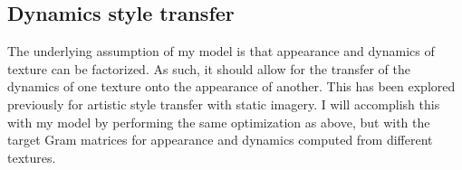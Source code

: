 \subsection{Dynamics style transfer}
The underlying assumption of my model is that appearance
and dynamics of texture can be factorized.
As such, it should allow for the transfer of the dynamics of
one texture onto the appearance of another.
This has been explored previously for artistic style transfer
\cite{champandard2016,gatys2017} with static imagery.
I will accomplish this with my model by performing the same 
optimization as above, but with the target Gram matrices for 
appearance and dynamics computed from different textures.